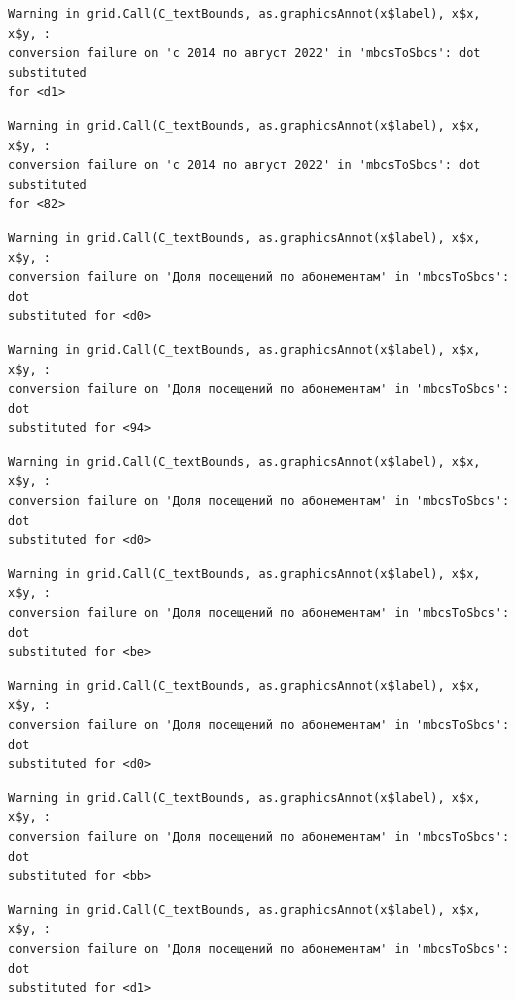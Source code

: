 \documentclass[
  letterpaper,
  DIV=11,
  numbers=noendperiod]{scrartcl}
\begin{document}
\begin{verbatim}
Warning in grid.Call(C_textBounds, as.graphicsAnnot(x$label), x$x, x$y, :
conversion failure on 'с 2014 по август 2022' in 'mbcsToSbcs': dot substituted
for <d1>
\end{verbatim}

\begin{verbatim}
Warning in grid.Call(C_textBounds, as.graphicsAnnot(x$label), x$x, x$y, :
conversion failure on 'с 2014 по август 2022' in 'mbcsToSbcs': dot substituted
for <82>
\end{verbatim}

\begin{verbatim}
Warning in grid.Call(C_textBounds, as.graphicsAnnot(x$label), x$x, x$y, :
conversion failure on 'Доля посещений по абонементам' in 'mbcsToSbcs': dot
substituted for <d0>
\end{verbatim}

\begin{verbatim}
Warning in grid.Call(C_textBounds, as.graphicsAnnot(x$label), x$x, x$y, :
conversion failure on 'Доля посещений по абонементам' in 'mbcsToSbcs': dot
substituted for <94>
\end{verbatim}

\begin{verbatim}
Warning in grid.Call(C_textBounds, as.graphicsAnnot(x$label), x$x, x$y, :
conversion failure on 'Доля посещений по абонементам' in 'mbcsToSbcs': dot
substituted for <d0>
\end{verbatim}

\begin{verbatim}
Warning in grid.Call(C_textBounds, as.graphicsAnnot(x$label), x$x, x$y, :
conversion failure on 'Доля посещений по абонементам' in 'mbcsToSbcs': dot
substituted for <be>
\end{verbatim}

\begin{verbatim}
Warning in grid.Call(C_textBounds, as.graphicsAnnot(x$label), x$x, x$y, :
conversion failure on 'Доля посещений по абонементам' in 'mbcsToSbcs': dot
substituted for <d0>
\end{verbatim}

\begin{verbatim}
Warning in grid.Call(C_textBounds, as.graphicsAnnot(x$label), x$x, x$y, :
conversion failure on 'Доля посещений по абонементам' in 'mbcsToSbcs': dot
substituted for <bb>
\end{verbatim}

\begin{verbatim}
Warning in grid.Call(C_textBounds, as.graphicsAnnot(x$label), x$x, x$y, :
conversion failure on 'Доля посещений по абонементам' in 'mbcsToSbcs': dot
substituted for <d1>
\end{verbatim}
\end{document}
